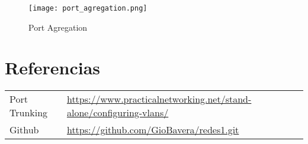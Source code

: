 \documentclass{article}
\begin{document}
\begin{figure}[ht]
    \centering
    \texttt{[image: port\_agregation.png]}
    \caption{Port Agregation}
    \label{fig:enter-label}
\end{figure}

\section{Referencias}
\begin{tabular}{ll}
Port Trunking  & \url{https://www.practicalnetworking.net/stand-alone/configuring-vlans/} \\
Github         & \url{https://github.com/GioBavera/redes1.git} \\
\end{tabular}
\end{document}
